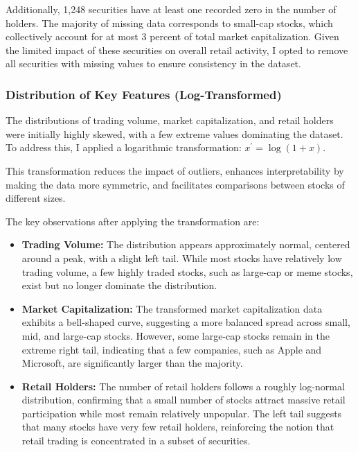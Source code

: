 \noindent Additionally, 1,248 securities have at least one recorded zero in the number of holders. The majority of missing data corresponds to small-cap stocks, which collectively account for at most 3 percent of total market capitalization. Given the limited impact of these securities on overall retail activity, I opted to remove all securities with missing values to ensure consistency in the dataset.  



\subsubsection{Distribution of Key Features (Log-Transformed)}
The distributions of trading volume, market capitalization, and retail holders were initially highly skewed, with a few extreme values dominating the dataset. To address this, I applied a logarithmic transformation: $x^\prime = \log(1+x)$. 

This transformation reduces the impact of outliers, enhances interpretability by making the data more symmetric, and facilitates comparisons between stocks of different sizes.

The key observations after applying the transformation are:
\begin{itemize}
    \item \textbf{Trading Volume:} The distribution appears approximately normal, centered around a peak, with a slight left tail. While most stocks have relatively low trading volume, a few highly traded stocks, such as large-cap or meme stocks, exist but no longer dominate the distribution.
    \item \textbf{Market Capitalization:} The transformed market capitalization data exhibits a bell-shaped curve, suggesting a more balanced spread across small, mid, and large-cap stocks. However, some large-cap stocks remain in the extreme right tail, indicating that a few companies, such as Apple and Microsoft, are significantly larger than the majority.
    
    \item \textbf{Retail Holders:} The number of retail holders follows a roughly log-normal distribution, confirming that a small number of stocks attract massive retail participation while most remain relatively unpopular. The left tail suggests that many stocks have very few retail holders, reinforcing the notion that retail trading is concentrated in a subset of securities.
\end{itemize}

